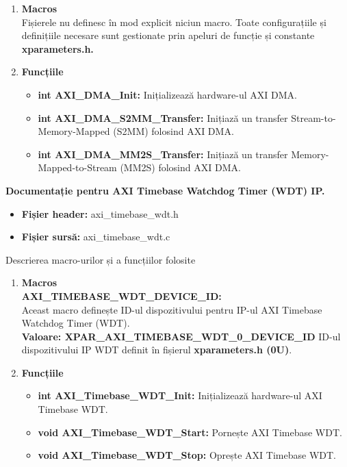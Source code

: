 \documentclass[12pt]{article}
\begin{document}
\begin{enumerate}
    \item \textbf{Macros}\\
    \hspace*{1cm} Fișierele nu definesc în mod explicit niciun macro. Toate configurațiile și definițiile necesare sunt gestionate prin apeluri de funcție și constante \textbf{xparameters.h.}
    \item \textbf{Funcțiile}
        \begin{itemize}
            \item \textbf{int AXI\_DMA\_Init:} Inițializează hardware-ul AXI DMA.
            \item \textbf{int AXI\_DMA\_S2MM\_Transfer:} Inițiază un transfer Stream-to-Memory-Mapped (S2MM) folosind AXI DMA.
            \item \textbf{int AXI\_DMA\_MM2S\_Transfer:} Inițiază un transfer Memory-Mapped-to-Stream (MM2S) folosind AXI DMA.\\
        \end{itemize}
\end{enumerate}
\textbf{Documentație pentru AXI Timebase Watchdog Timer (WDT) IP.}
 \begin{itemize}
    \item \textbf{Fișier header:} axi\_timebase\_wdt.h
    \item \textbf{Fișier sursă:} axi\_timebase\_wdt.c\\
 \end{itemize}
\hspace*{1cm}Descrierea macro-urilor și a funcțiilor folosite
\begin{enumerate}
    \item \textbf{Macros}\\
    \hspace*{1cm} \textbf{AXI\_TIMEBASE\_WDT\_DEVICE\_ID:} \\
    \hspace*{1cm} Aceast macro definește ID-ul dispozitivului pentru IP-ul AXI Timebase Watchdog Timer (WDT).\\
    \hspace*{1cm} \textbf{Valoare: XPAR\_AXI\_TIMEBASE\_WDT\_0\_DEVICE\_ID } ID-ul dispozitivului IP WDT definit în fișierul \textbf{xparameters.h (0U)}.
    \item \textbf{Funcțiile}
        \begin{itemize}
            \item \textbf{int AXI\_Timebase\_WDT\_Init:} Inițializează hardware-ul AXI Timebase WDT.
            \item \textbf{void AXI\_Timebase\_WDT\_Start:} Pornește AXI Timebase WDT.
            \item \textbf{void AXI\_Timebase\_WDT\_Stop:} Oprește AXI Timebase WDT.\\
        \end{itemize}
\end{enumerate}
\end{document}
